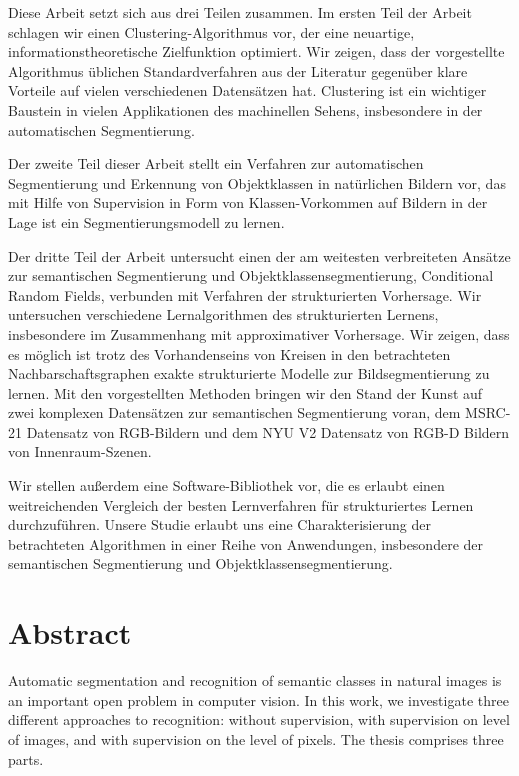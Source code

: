 \documentclass[12pt,toc=bibnumbered, a4paper,twoside,DIV=11,BCOR=1cm]{scrbook}
\begin{document}
Diese Arbeit setzt sich aus drei Teilen zusammen.
Im ersten Teil der Arbeit schlagen wir einen Clustering-Algorithmus vor,
der eine neuartige, informationstheoretische Zielfunktion optimiert. Wir zeigen, dass
der vorgestellte Algorithmus \"ublichen Standardverfahren aus der Literatur gegen\"uber
klare Vorteile auf vielen verschiedenen Datens\"atzen hat. Clustering ist ein wichtiger
Baustein in vielen Applikationen des machinellen Sehens, insbesondere in der
automatischen Segmentierung.

Der zweite Teil dieser Arbeit stellt ein Verfahren zur automatischen
Segmentierung und Erkennung von Objektklassen in nat\"urlichen Bildern vor, das
mit Hilfe von Supervision in Form von Klassen-Vorkommen auf Bildern in der Lage
ist ein Segmentierungsmodell zu lernen.

Der dritte Teil der Arbeit untersucht einen der am weitesten
verbreiteten Ans\"atze zur semantischen Segmentierung und
Objektklassensegmentierung, Conditional Random Fields, verbunden mit Verfahren
der strukturierten Vorhersage.
%
Wir untersuchen verschiedene Lernalgorithmen des strukturierten Lernens,
insbesondere im Zusammenhang mit approximativer Vorhersage. Wir zeigen, dass es
m\"oglich ist trotz des Vorhandenseins von Kreisen in den betrachteten Nachbarschaftsgraphen
exakte strukturierte Modelle zur Bildsegmentierung zu lernen.  Mit den
vorgestellten Methoden bringen wir den Stand der Kunst auf zwei komplexen
Datens\"atzen zur semantischen Segmentierung voran, dem MSRC-21 Datensatz von
RGB-Bildern und dem NYU V2 Datensatz von RGB-D Bildern von Innenraum-Szenen.

\enlargethispage{15mm}
Wir stellen au{\ss}erdem eine Software-Bibliothek vor, die es erlaubt einen
weitreichenden Vergleich der besten Lernverfahren f\"ur strukturiertes Lernen
durchzuf\"uhren.
Unsere Studie erlaubt uns eine Charakterisierung der betrachteten Algorithmen
in einer Reihe von Anwendungen, insbesondere der semantischen Segmentierung und
Objektklassensegmentierung.

\chapter*{Abstract}
Automatic segmentation and recognition of semantic classes in natural images is
an important open problem in computer vision. In this work, we investigate
three different approaches to recognition: without supervision, with
supervision on level of images, and with supervision on the level of pixels.
The thesis comprises three parts.
\end{document}
